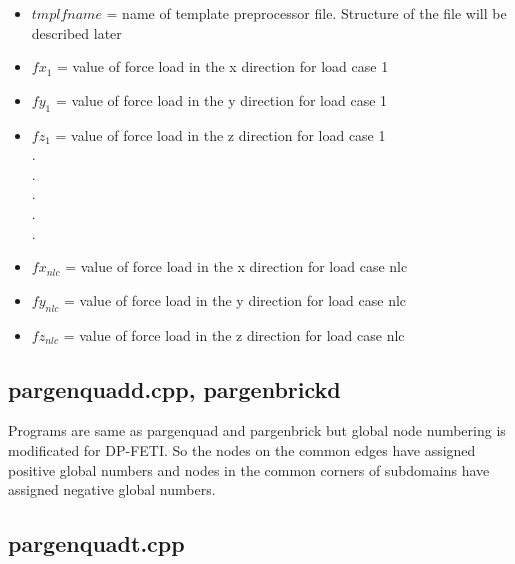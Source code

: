 \documentclass[12pt]{book}
\begin{document}
\begin{itemize}
\item $tmplfname$ = name of template preprocessor file. Structure of the file will be described later
\item $fx_1$      = value of force load in the x direction for load case 1
\item $fy_1$      = value of force load in the y direction for load case 1
\item $fz_1$      = value of force load in the z direction for load case 1\\
.\\
.\\
.\\
.\\
.\\
\item $fx_{nlc}$    = value of force load in the x direction for load case nlc
\item $fy_{nlc}$    = value of force load in the y direction for load case nlc
\item $fz_{nlc}$    = value of force load in the z direction for load case nlc
\end{itemize}

\subsection {pargenquadd.cpp, pargenbrickd}

Programs are same as pargenquad and pargenbrick but global node numbering is
modificated for DP-FETI. So the nodes on the common edges have assigned positive global numbers and
nodes in the common corners of subdomains have assigned negative global numbers.


\subsection {pargenquadt.cpp}
\end{document}
